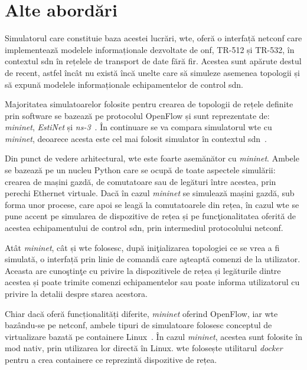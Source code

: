 \section{Alte abordări}

Simulatorul care constituie baza acestei lucrări, \gls{wte}, oferă o interfață \gls{netconf} care implementează modelele informaționale dezvoltate de \gls{onf}, TR-512 și TR-532, în contextul \gls{sdn} în rețelele de transport de date fără fir. Acestea sunt apărute destul de recent, astfel încât nu există încă unelte care să simuleze asemenea topologii și să expună modelele informaționale echipamentelor de control \gls{sdn}.

Majoritatea simulatoarelor folosite pentru crearea de topologii de rețele definite prin software se bazează pe protocolul OpenFlow și sunt reprezentate de: \textit{mininet}, \textit{EstiNet} și \textit{ns-3}~\cite{lantz2010network,wang2013estinet,wang2014comparison,henderson2008network}. În continuare se va compara simulatorul \gls{wte} cu \textit{mininet}, deoarece acesta este cel mai folosit simulator în contextul \gls{sdn}~\cite{brandonheller2013}.

Din punct de vedere arhitectural, \gls{wte} este foarte asemănător cu \textit{mininet}. Ambele se bazează pe un nucleu Python care se ocupă de toate aspectele simulării: crearea de mașini gazdă, de comutatoare sau de legături între acestea, prin perechi Ethernet virtuale. Dacă în cazul \textit{mininet} se simulează mașini gazdă, sub forma unor procese, care apoi se leagă la comutatoarele din rețea, în cazul \gls{wte} se pune accent pe simularea de dispozitive de rețea și pe funcţionalitatea oferită de acestea echipamentului de control \gls{sdn}, prin intermediul protocolului \gls{netconf}.

Atât \textit{mininet}, cât și \gls{wte} folosesc, după iniţializarea topologiei ce se vrea a fi simulată, o interfață prin linie de comandă care aşteaptă comenzi de la utilizator. Aceasta are cunoştinţe cu privire la dispozitivele de rețea și legăturile dintre acestea și poate trimite comenzi echipamentelor sau poate informa utilizatorul cu privire la detalii despre starea acestora.

Chiar dacă oferă funcționalități diferite, \textit{mininet} oferind OpenFlow, iar \gls{wte} bazându-se pe \gls{netconf}, ambele tipuri de simulatoare folosesc conceptul de virtualizare bazată pe containere Linux~\cite{handigol2012reproducible}. În cazul \textit{mininet}, acestea sunt folosite în mod nativ, prin utilizarea lor directă în Linux. \gls{wte} folosește utilitarul \textit{docker} pentru a crea containere ce reprezintă dispozitive de rețea.

